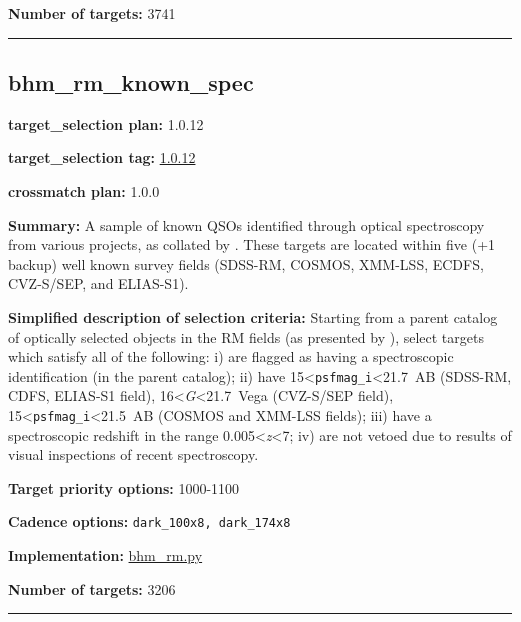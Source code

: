 \noindent\textbf{Number of targets:} 3741

\begin{center}\rule{0.5\linewidth}{0.5pt}\end{center}

\hypertarget{bhm_rm_known_spec_plan1.0.12}{%
\subsection{bhm\_rm\_known\_spec}\label{bhm_rm_known_spec_plan1.0.12}}

\noindent\textbf{target\_selection plan:} 1.0.12

\noindent\textbf{target\_selection tag:}
\href{https://github.com/sdss/target_selection/tree/1.0.12/}{1.0.12}

\noindent\textbf{crossmatch plan:} 1.0.0

\noindent\textbf{Summary:} A sample of known QSOs identified through optical
spectroscopy from various projects, as collated by
\citet{Yang2022}. These targets are located within five (+1 backup) well
known survey fields (SDSS-RM, COSMOS, XMM-LSS, ECDFS, CVZ-S/SEP, and
ELIAS-S1).

\noindent\textbf{Simplified description of selection criteria:} Starting from a
parent catalog of optically selected objects in the RM fields (as
presented by
\citealt{Yang2022}), select targets which satisfy all of the following: i)
are flagged as having a spectroscopic identification (in the parent
catalog); ii) have 15\textless{}\texttt{psfmag\_i}\textless21.7~AB
(SDSS-RM, CDFS, ELIAS-S1 field), 16\textless{}\emph{G}\textless21.7~Vega
(CVZ-S/SEP field), 15\textless{}\texttt{psfmag\_i}\textless21.5~AB
(COSMOS and XMM-LSS fields); iii) have a spectroscopic redshift in the
range 0.005\textless{}\emph{z}\textless7; iv) are not vetoed due to
results of visual inspections of recent spectroscopy.


\noindent\textbf{Target priority options:} 1000-1100

\noindent\textbf{Cadence options:} \texttt{dark\_100x8,\ dark\_174x8}

\noindent\textbf{Implementation:}
\href{https://github.com/sdss/target_selection/blob/1.0.12/python/target_selection/cartons/bhm_rm.py}{bhm\_rm.py}

\noindent\textbf{Number of targets:} 3206

\begin{center}\rule{0.5\linewidth}{0.5pt}\end{center}

